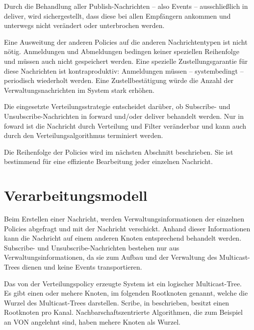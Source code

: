 Durch die Behandlung aller Publish-Nachrichten -- also Events -- ausschließlich in deliver, wird sichergestellt, dass diese bei allen Empfängern ankommen und unterwegs nicht verändert oder unterbrochen werden.

Eine Ausweitung der anderen Policies auf die anderen Nachrichtentypen ist nicht nötig. Anmeldungen und Abmeldungen bedingen keiner speziellen Reihenfolge und müssen auch nicht gespeichert werden. Eine spezielle Zustellungsgarantie für diese Nachrichten ist kontraproduktiv:  Anmeldungen müssen -- systembedingt -- periodisch wiederholt werden. Eine Zustellbestätigung würde die Anzahl der Verwaltungsnachrichten im System stark erhöhen.

Die eingesetzte Verteilungsstrategie entscheidet darüber, ob Subscribe- und Unsubscribe-Nachrichten in forward und/oder deliver behandelt werden. Nur in foward ist die Nachricht durch Verteilung und Filter veränderbar und kann auch durch den Verteilungsalgorithmus terminiert werden.

Die Reihenfolge der Policies wird im nächsten Abschnitt beschrieben. Sie ist bestimmend für eine effiziente Bearbeitung jeder einzelnen Nachricht.

\section{Verarbeitungsmodell}
Beim Erstellen einer Nachricht, werden Verwaltungsinformationen der einzelnen Policies abgefragt und mit der Nachricht verschickt. Anhand dieser Informationen kann die Nachricht auf einem anderen Knoten entsprechend behandelt werden. Subscribe- und Unsubscribe-Nachrichten bestehen nur aus Verwaltungsinformationen, da sie zum Aufbau und der Verwaltung des Multicast-Trees dienen und keine Events transportieren.

Das von der Verteilungspolicy erzeugte System ist ein logischer Multicast-Tree. Es gibt einen oder mehere Knoten, im folgenden Rootknoten genannt, welche die Wurzel des Multicast-Trees darstellen. Scribe, in  beschrieben, besitzt einen Rootknoten pro Kanal. Nachbarschaftszentrierte Algorithmen, die zum Beispiel an VON \cite{Hu2006VON} angelehnt sind, haben mehere Knoten als Wurzel. 

